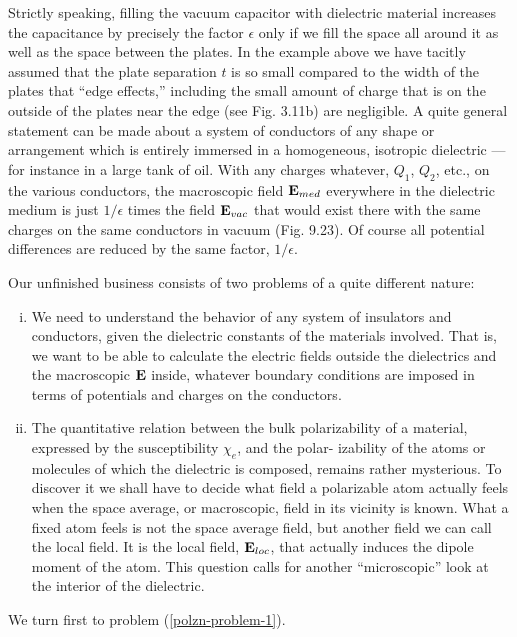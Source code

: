Strictly speaking, filling the vacuum capacitor with dielectric material
increases the capacitance by precisely the factor $\epsilon$ only if we
fill the space all around it as well as the space between the plates.
In the example above we have tacitly assumed that the plate separation
$t$ is so small compared to the width of the plates that ``edge
effects,'' including the small amount of charge that is on the outside
of the plates near the edge (see Fig. 3.11b) are negligible. A quite
general statement can be made about a system of conductors of any
shape or arrangement which is entirely immersed in a homogeneous,
isotropic dielectric --- for instance in a large tank of oil. With any
charges whatever, $Q_1$, $Q_2$, etc., on the various conductors, the macroscopic
field $\mathbf{E}_{med}$ everywhere in the dielectric medium is just $1/\epsilon$ times
the field $\mathbf{E}_{vac}$ that would exist there with the same charges on the
same conductors in vacuum (Fig. 9.23). Of course all potential
differences are reduced by the same factor, $1/\epsilon$.

Our unfinished business consists of two problems of a quite different
nature:

\begin{enumerate}[(i)]
\item We need to understand the behavior of any system of insulators
and conductors, given the dielectric constants of the
materials involved. That is, we want to be able to calculate
the electric fields outside the dielectrics and the macroscopic
$\mathbf{E}$ inside, whatever boundary conditions are imposed
in terms of potentials and charges on the conductors.\label{polzn-problem-1}

\item The quantitative relation between the bulk polarizability of
a material, expressed by the susceptibility $\chi_e$, and the polar-
izability of the atoms or molecules of which the dielectric
is composed, remains rather mysterious. To discover it
we shall have to decide what field a polarizable atom
actually feels when the space average, or macroscopic, field
in its vicinity is known. What a fixed atom feels is not the
space average field, but another field we can call the local
field. It is the local field, $\mathbf{E}_{loc}$, that actually induces the
dipole moment of the atom. This question calls for another
``microscopic'' look at the interior of the dielectric.
\end{enumerate}

We turn first to problem (\ref{polzn-problem-1}).

